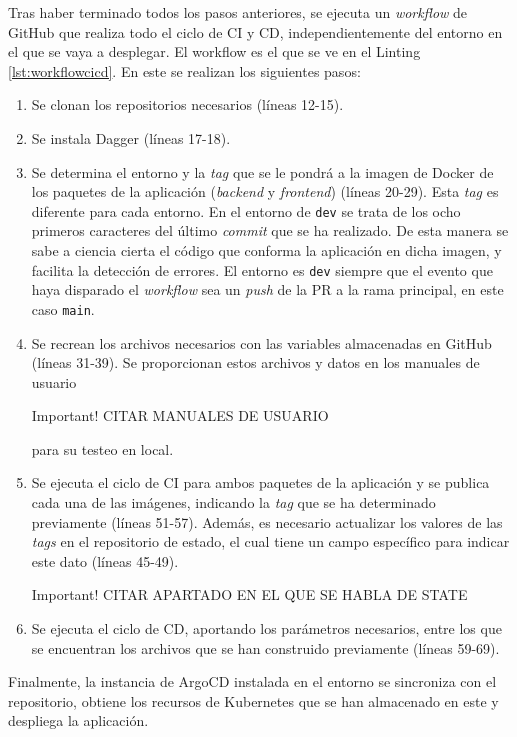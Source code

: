 \begin{itemize}
    Tras haber terminado todos los pasos anteriores, se ejecuta un \textit{workflow} de GitHub que realiza todo el ciclo de CI y CD, independientemente del entorno en el que se vaya a desplegar. El workflow es el que se ve en el Linting \ref{lst:workflowcicd}. En este se realizan los siguientes pasos:

    \begin{enumerate}
      \item Se clonan los repositorios necesarios (líneas 12-15).
      \item Se instala Dagger (líneas 17-18).
      \item Se determina el entorno y la \textit{tag} que se le pondrá a la imagen de Docker de los paquetes de la aplicación (\textit{backend} y \textit{frontend}) (líneas 20-29). Esta \textit{tag} es diferente para cada entorno. En el entorno de \texttt{dev} se trata de los ocho primeros caracteres del último \textit{commit} que se ha realizado. De esta manera se sabe a ciencia cierta el código que conforma la aplicación en dicha imagen, y facilita la detección de errores. El entorno es \texttt{dev} siempre que el evento que haya disparado el \textit{workflow} sea un \textit{push} de la PR a la rama principal, en este caso \texttt{main}.
      \item Se recrean los archivos necesarios con las variables almacenadas en GitHub (líneas 31-39). Se proporcionan estos archivos y datos en los manuales de usuario
        \begin{bclogo}[logo=\bcattention]{Important!}
          CITAR MANUALES DE USUARIO
        \end{bclogo}
        para su testeo en local.
      \item Se ejecuta el ciclo de CI para ambos paquetes de la aplicación y se publica cada una de las imágenes, indicando la \textit{tag} que se ha determinado previamente (líneas 51-57). Además, es necesario actualizar los valores de las \textit{tags} en el repositorio de estado, el cual tiene un campo específico para indicar este dato (líneas 45-49).
        \begin{bclogo}[logo=\bcattention]{Important!}
          CITAR APARTADO EN EL QUE SE HABLA DE STATE
        \end{bclogo}
      \item Se ejecuta el ciclo de CD, aportando los parámetros necesarios, entre los que se encuentran los archivos que se han construido previamente (líneas 59-69).
    \end{enumerate}

    Finalmente, la instancia de ArgoCD instalada en el entorno se sincroniza con el repositorio, obtiene los recursos de Kubernetes que se han almacenado en este y despliega la aplicación.

\end{itemize}


